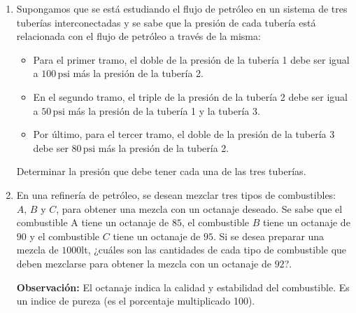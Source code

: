 \documentclass[11pt]{article}
\begin{document}
\begin{enumerate}[\hspace{-7mm} 1) ]
\item 
Supongamos que se está estudiando el flujo de petróleo en un sistema de tres tuberías interconectadas y se sabe que la presión de cada tubería está relacionada con el flujo de petróleo a través de la misma:
\begin{itemize}
    \item Para el primer tramo, el doble de la presión de la tubería 1 debe ser igual a \( 100 \, \text{psi} \) más la presión de la tubería 2.
    \item En el segundo tramo, el triple de la presión de la tubería 2 debe ser igual a \( 50 \, \text{psi} \) más la presión de la tubería 1 y la tubería 3.
    \item Por último, para el tercer tramo, el doble de la presión de la tubería 3 debe ser \( 80 \, \text{psi} \) más la presión de la tubería 2.
\end{itemize}
Determinar la presión que debe tener cada una de las tres tuberías.






















\item En una refinería de petróleo, se desean mezclar tres tipos de combustibles: $A,\, B$ y $C$, para obtener una mezcla con un octanaje deseado. Se sabe que el combustible A tiene un octanaje de $85$, el combustible $B$ tiene un octanaje de $90$ y el combustible $C$ tiene un octanaje de $95$. Si se desea preparar una mezcla de $1000$lt, ¿cuáles son las cantidades de cada tipo de combustible que deben mezclarse para obtener la mezcla con un octanaje de $92$?.


{\bf Observación:} El octanaje indica la calidad y estabilidad del combustible. Es un indice de pureza (es el porcentaje multiplicado 100).









\end{enumerate}
\end{document}
